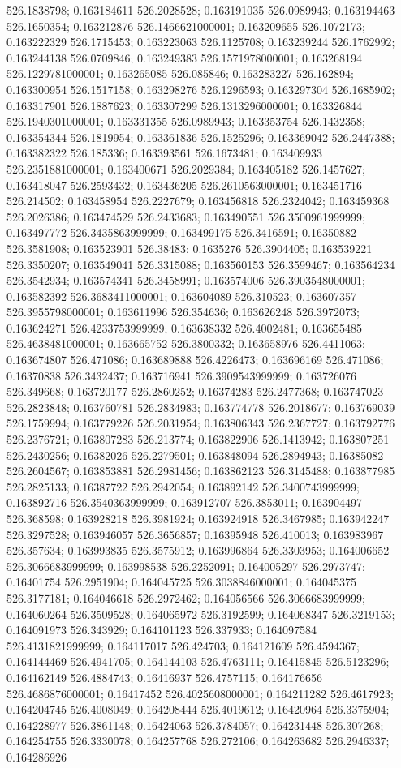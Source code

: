 526.1838798; 0.163184611 526.2028528; 0.163191035 526.0989943; 0.163194463 526.1650354; 0.163212876 526.1466621000001; 0.163209655 526.1072173; 0.163222329 526.1715453; 0.163223063 526.1125708; 0.163239244 526.1762992; 0.163244138 526.0709846; 0.163249383 526.1571978000001; 0.163268194 526.1229781000001; 0.163265085 526.085846; 0.163283227 526.162894; 0.163300954 526.1517158; 0.163298276 526.1296593; 0.163297304 526.1685902; 0.163317901 526.1887623; 0.163307299 526.1313296000001; 0.163326844 526.1940301000001; 0.163331355 526.0989943; 0.163353754 526.1432358; 0.163354344 526.1819954; 0.163361836 526.1525296; 0.163369042 526.2447388; 0.163382322 526.185336; 0.163393561 526.1673481; 0.163409933 526.2351881000001; 0.163400671 526.2029384; 0.163405182 526.1457627; 0.163418047 526.2593432; 0.163436205 526.2610563000001; 0.163451716 526.214502; 0.163458954 526.2227679; 0.163456818 526.2324042; 0.163459368 526.2026386; 0.163474529 526.2433683; 0.163490551 526.3500961999999; 0.163497772 526.3435863999999; 0.163499175 526.3416591; 0.16350882 526.3581908; 0.163523901 526.38483; 0.1635276 526.3904405; 0.163539221 526.3350207; 0.163549041 526.3315088; 0.163560153 526.3599467; 0.163564234 526.3542934; 0.163574341 526.3458991; 0.163574006 526.3903548000001; 0.163582392 526.3683411000001; 0.163604089 526.310523; 0.163607357 526.3955798000001; 0.163611996 526.354636; 0.163626248 526.3972073; 0.163624271 526.4233753999999; 0.163638332 526.4002481; 0.163655485 526.4638481000001; 0.163665752 526.3800332; 0.163658976 526.4411063; 0.163674807 526.471086; 0.163689888 526.4226473; 0.163696169 526.471086; 0.16370838 526.3432437; 0.163716941 526.3909543999999; 0.163726076 526.349668; 0.163720177 526.2860252; 0.16374283 526.2477368; 0.163747023 526.2823848; 0.163760781 526.2834983; 0.163774778 526.2018677; 0.163769039 526.1759994; 0.163779226 526.2031954; 0.163806343 526.2367727; 0.163792776 526.2376721; 0.163807283 526.213774; 0.163822906 526.1413942; 0.163807251 526.2430256; 0.16382026 526.2279501; 0.163848094 526.2894943; 0.16385082 526.2604567; 0.163853881 526.2981456; 0.163862123 526.3145488; 0.163877985 526.2825133; 0.16387722 526.2942054; 0.163892142 526.3400743999999; 0.163892716 526.3540363999999; 0.163912707 526.3853011; 0.163904497 526.368598; 0.163928218 526.3981924; 0.163924918 526.3467985; 0.163942247 526.3297528; 0.163946057 526.3656857; 0.16395948 526.410013; 0.163983967 526.357634; 0.163993835 526.3575912; 0.163996864 526.3303953; 0.164006652 526.3066683999999; 0.163998538 526.2252091; 0.164005297 526.2973747; 0.16401754 526.2951904; 0.164045725 526.3038846000001; 0.164045375 526.3177181; 0.164046618 526.2972462; 0.164056566 526.3066683999999; 0.164060264 526.3509528; 0.164065972 526.3192599; 0.164068347 526.3219153; 0.164091973 526.343929; 0.164101123 526.337933; 0.164097584 526.4131821999999; 0.164117017 526.424703; 0.164121609 526.4594367; 0.164144469 526.4941705; 0.164144103 526.4763111; 0.16415845 526.5123296; 0.164162149 526.4884743; 0.16416937 526.4757115; 0.164176656 526.4686876000001; 0.16417452 526.4025608000001; 0.164211282 526.4617923; 0.164204745 526.4008049; 0.164208444 526.4019612; 0.16420964 526.3375904; 0.164228977 526.3861148; 0.16424063 526.3784057; 0.164231448 526.307268; 0.164254755 526.3330078; 0.164257768 526.272106; 0.164263682 526.2946337; 0.164286926 
